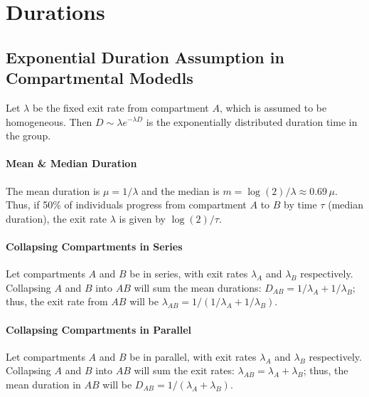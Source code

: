 \section{Durations}\label{app.math.dur}
\subsection{Exponential Duration Assumption in Compartmental Modedls}\label{app.math.dur.exp}
Let $\lambda$ be the fixed exit rate from compartment $A$, which is assumed to be homogeneous.
Then $D \sim \lambda e^{-\lambda D}$ is %
the exponentially distributed duration time in the group.
\paragraph{Mean \& Median Duration}
The mean duration is $\mu = 1/\lambda$ and the median is $m = \log(2)/\lambda \approx 0.69\,\mu$.
Thus, if 50\% of individuals progress from compartment $A$ to $B$ by time $\tau$ (median duration),
the exit rate $\lambda$ is given by $\log(2)/\tau$.
\paragraph{Collapsing Compartments in Series}
Let compartments $A$ and $B$ be in series, with exit rates $\lambda_A$ and $\lambda_B$ respectively.
Collapsing $A$ and $B$ into $AB$ will sum the mean durations: $D_{AB} = 1/\lambda_A + 1/\lambda_B$;
thus, the exit rate from $AB$ will be $\lambda_{AB} = 1/(1/\lambda_A + 1/\lambda_B)$.
\paragraph{Collapsing Compartments in Parallel}
Let compartments $A$ and $B$ be in parallel, with exit rates $\lambda_A$ and $\lambda_B$ respectively.
Collapsing $A$ and $B$ into $AB$ will sum the exit rates: $\lambda_{AB} = \lambda_A + \lambda_B$;
thus, the mean duration in $AB$ will be $D_{AB} = 1/(\lambda_A + \lambda_B)$.
